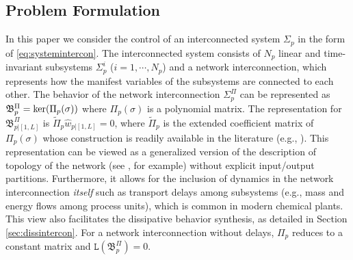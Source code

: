 \documentclass[11pt,print,draftcls,onecolumn,romanappendices]{ieeecolor}
\newcommand{\lag}[1]{\mathtt{L}\left(#1\right)}
\newcommand{\revise}[1]{{\color{black} #1}}
\newcommand{\B}{\mathfrak{B}}
\newcommand{\bint}[1]{{|[#1]}}
\begin{document}
\subsection{Problem Formulation}
In this paper we consider the control of an interconnected system $\Sigma_p$ in the form of \eqref{eq:systemintercon}. \revise{The interconnected system consists of $N_p$ linear and time-invariant subsystems $\Sigma_p^i$ ($i=1,\cdots, N_p$) and a network interconnection, which represents how the manifest variables of the subsystems are connected to each other.} The behavior of the \revise{network interconnection} $\Sigma_p^\Pi$ can be represented as $\B_p^\Pi=\revise{\ker(\Pi_p(\sigma))}$ where $\Pi_p(\sigma)$ is a \revise{polynomial} matrix. \revise{The representation for $\B_{p\bint{1,L}}^\Pi$ is $\widetilde{\Pi}_p\hat{w}_{p\bint{1,L}}=0$, where $\widetilde{\Pi}_p$ is the extended coefficient matrix of $\Pi_p(\sigma)$ whose construction is readily available in the literature (e.g., \cite{Yan:2019}).} This representation can be viewed as a generalized version of the description of topology of the network (see \cite{Tippett:2014}, for example) without explicit input/output partitions. Furthermore, \revise{it allows for the inclusion of dynamics in the network interconnection \emph{itself} such as transport delays among subsystems (e.g., mass and energy flows among process units), which is common in modern chemical plants. This view also facilitates the dissipative behavior synthesis, as detailed in Section \ref{sec:dissintercon}. For a network interconnection without delays, $\Pi_p$ reduces to a constant matrix and} $\lag{\B_p^\Pi}=0$.
\end{document}
